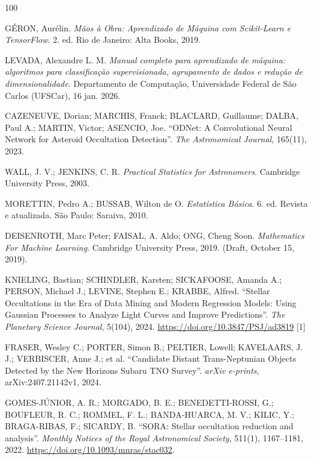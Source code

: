 \documentclass[msc]{on} %
\begin{document}
\begin{thebibliography}{100}

 G\'ERON, Aur\'elin. \textit{M\~aos \`a Obra: Aprendizado de M\'aquina com Scikit-Learn e TensorFlow}. 2. ed. Rio de Janeiro: Alta Books, 2019.

 LEVADA, Alexandre L. M. \textit{Manual completo para aprendizado de m\'aquina: algoritmos para classifica\c{c}\~ao supervisionada, agrupamento de dados e redu\c{c}\~ao de dimensionalidade}. Departamento de Computa\c{c}\~ao, Universidade Federal de S\~ao Carlos (UFSCar), 16 jan. 2026.

 CAZENEUVE, Dorian; MARCHIS, Franck; BLACLARD, Guillaume; DALBA, Paul A.; MARTIN, Victor; ASENCIO, Joe. ``ODNet: A Convolutional Neural Network for Asteroid Occultation Detection''. \emph{The Astronomical Journal}, 165(11), 2023.

 WALL, J. V.; JENKINS, C. R. \textit{Practical Statistics for Astronomers}. Cambridge University Press, 2003.

 MORETTIN, Pedro A.; BUSSAB, Wilton de O. \textit{Estatística Básica}. 6. ed. Revista e atualizada. São Paulo: Saraiva, 2010.

 DEISENROTH, Marc Peter; FAISAL, A. Aldo; ONG, Cheng Soon. \textit{Mathematics For Machine Learning}. Cambridge University Press, 2019. (Draft, October 15, 2019).

 KNIELING, Bastian; SCHINDLER, Karsten; SICKAFOOSE, Amanda A.; PERSON, Michael J.; LEVINE, Stephen E.; KRABBE, Alfred. ``Stellar Occultations in the Era of Data Mining and Modern Regression Models: Using Gaussian Processes to Analyze Light Curves and Improve Predictions''. \emph{The Planetary Science Journal}, 5(104), 2024. \url{https://doi.org/10.3847/PSJ/ad3819} [1]

 FRASER, Wesley C.; PORTER, Simon B.; PELTIER, Lowell; KAVELAARS, J. J.; VERBISCER, Anne J.; et al. ``Candidate Distant Trans-Neptunian Objects Detected by the New Horizons Subaru TNO Survey''. \emph{arXiv e-prints}, arXiv:2407.21142v1, 2024.

 GOMES-JÚNIOR, A. R.; MORGADO, B. E.; BENEDETTI-ROSSI, G.; BOUFLEUR, R. C.; ROMMEL, F. L.; BANDA-HUARCA, M. V.; KILIC, Y.; BRAGA-RIBAS, F.; SICARDY, B. ``SORA: Stellar occultation reduction and analysis''. \emph{Monthly Notices of the Royal Astronomical Society}, 511(1), 1167--1181, 2022. \url{https://doi.org/10.1093/mnras/stac032}.


\end{thebibliography}
\end{document}
